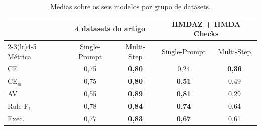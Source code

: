 \documentclass[11pt,a4paper]{article}
\begin{document}
\begin{table}[H]
\centering\small
\begin{tabular}{lcccc}
\toprule
 & \multicolumn{2}{c}{4 datasets do artigo} & \multicolumn{2}{c}{HMDAZ + HMDA Checks}\\
\cmidrule(lr){2-3}\cmidrule(lr){4-5}
Métrica & Single-Prompt & Multi-Step & Single-Prompt & Multi-Step\\
\midrule
CE & 0,75 & \textbf{0,80} & 0,24 & \textbf{0,36}\\
CE$_\equiv$ & 0,75 & \textbf{0,80} & \textbf{0,51} & 0,49\\
AV & 0,55 & \textbf{0,89} & \textbf{0,81} & 0,29\\
Rule-F$_1$ & 0,78 & \textbf{0,84} & \textbf{0,74} & 0,64\\
Exec. & 0,77 & \textbf{0,83} & \textbf{0,67} & 0,61\\
\bottomrule
\end{tabular}
\caption{Médias sobre os seis modelos por grupo de datasets.}
\end{table}


\end{document}
